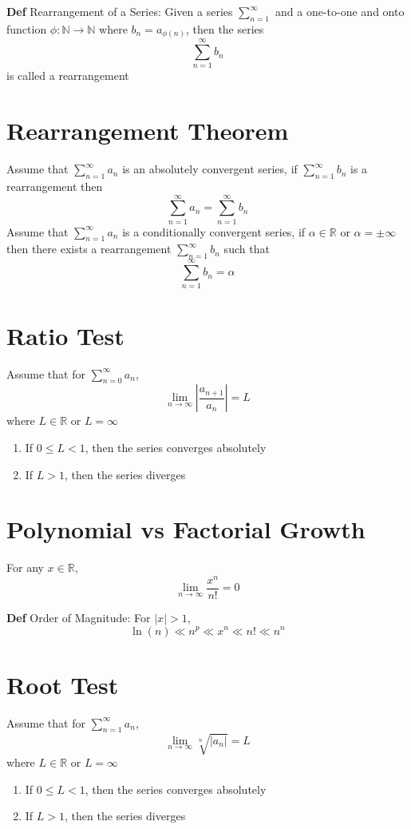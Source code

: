 \documentclass[11pt,notitlepage]{report}
\begin{document}
\textbf{Def} Rearrangement of a Series: Given a series $\sum_{n = 1}^\infty$ and a one-to-one and onto function $\phi: \mathbb N \to \mathbb N$ where $b_n = a_{\phi(n)}$, then the series $$\sum_{n=1}^\infty b_n$$ is called a rearrangement

\section{Rearrangement Theorem}Assume that $\sum_{n=1}^\infty a_n$ is an absolutely convergent series, if $\sum_{n=1}^\infty b_n$ is a rearrangement then
$$\sum_{n=1}^\infty a_n = \sum_{n=1}^\infty b_n$$
Assume that $\sum_{n=1}^\infty a_n$ is a conditionally convergent series, if $\alpha \in \mathbb R$ or $\alpha = \pm \infty$ then there exists a rearrangement $\sum_{n=1}^\infty b_n$ such that
$$\sum_{n=1}^\infty b_n = \alpha$$

\section{Ratio Test}Assume that for $\sum_{n=0}^\infty a_n$,
$$\lim_{n \to \infty} \left|\frac{a_{n+1}}{a_n}\right| = L$$ where $L \in \mathbb R$ or $L = \infty$
\begin{enumerate}
    \item If $0 \leq L < 1$, then the series converges absolutely
    \item If $L > 1$, then the series diverges
\end{enumerate}

\section{Polynomial vs Factorial Growth}For any $x \in \mathbb R$,
$$\lim_{n \to \infty} \frac{x^n}{n!} = 0$$

\textbf{Def} Order of Magnitude: For $|x| > 1$, $$\ln(n) \ll n^p \ll x^n \ll n! \ll n^n$$

\section{Root Test}Assume that for $\sum_{n=1}^\infty a_n$,
$$\lim_{n \to \infty} \sqrt[n]{|a_n|} = L$$ where $L \in \mathbb R$ or $L = \infty$
\begin{enumerate}
    \item If $0 \leq L < 1$, then the series converges absolutely
    \item If $L > 1$, then the series diverges
\end{enumerate}
\newpage
\end{document}
